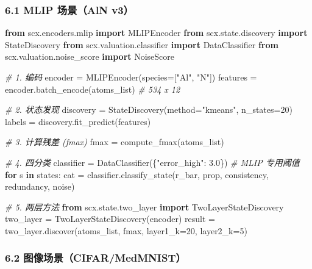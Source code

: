 \documentclass[
  12pt,
]{ctexart}
\newenvironment{Shaded}{}{}
\newcommand{\CommentTok}[1]{\textcolor[rgb]{0.38,0.63,0.69}{\textit{#1}}}
\newcommand{\ControlFlowTok}[1]{\textcolor[rgb]{0.00,0.44,0.13}{\textbf{#1}}}
\newcommand{\DecValTok}[1]{\textcolor[rgb]{0.25,0.63,0.44}{#1}}
\newcommand{\FloatTok}[1]{\textcolor[rgb]{0.25,0.63,0.44}{#1}}
\newcommand{\ImportTok}[1]{\textcolor[rgb]{0.00,0.50,0.00}{\textbf{#1}}}
\newcommand{\KeywordTok}[1]{\textcolor[rgb]{0.00,0.44,0.13}{\textbf{#1}}}
\newcommand{\NormalTok}[1]{#1}
\newcommand{\OperatorTok}[1]{\textcolor[rgb]{0.40,0.40,0.40}{#1}}
\newcommand{\StringTok}[1]{\textcolor[rgb]{0.25,0.44,0.63}{#1}}
\begin{document}
\subsubsection{6.1 MLIP 场景（AlN v3）}\label{mlip-ux573aux666faln-v3}

\begin{Shaded}
\begin{Highlighting}[]
\ImportTok{from}\NormalTok{ scx.encoders.mlip }\ImportTok{import}\NormalTok{ MLIPEncoder}
\ImportTok{from}\NormalTok{ scx.state.discovery }\ImportTok{import}\NormalTok{ StateDiscovery}
\ImportTok{from}\NormalTok{ scx.valuation.classifier }\ImportTok{import}\NormalTok{ DataClassifier}
\ImportTok{from}\NormalTok{ scx.valuation.noise\_score }\ImportTok{import}\NormalTok{ NoiseScore}

\CommentTok{\# 1. 编码}
\NormalTok{encoder }\OperatorTok{=}\NormalTok{ MLIPEncoder(species}\OperatorTok{=}\NormalTok{[}\StringTok{"Al"}\NormalTok{, }\StringTok{"N"}\NormalTok{])}
\NormalTok{features }\OperatorTok{=}\NormalTok{ encoder.batch\_encode(atoms\_list)  }\CommentTok{\# 534 x 12}

\CommentTok{\# 2. 状态发现}
\NormalTok{discovery }\OperatorTok{=}\NormalTok{ StateDiscovery(method}\OperatorTok{=}\StringTok{"kmeans"}\NormalTok{, n\_states}\OperatorTok{=}\DecValTok{20}\NormalTok{)}
\NormalTok{labels }\OperatorTok{=}\NormalTok{ discovery.fit\_predict(features)}

\CommentTok{\# 3. 计算残差 (fmax)}
\NormalTok{fmax }\OperatorTok{=}\NormalTok{ compute\_fmax(atoms\_list)}

\CommentTok{\# 4. 四分类}
\NormalTok{classifier }\OperatorTok{=}\NormalTok{ DataClassifier(\{}\StringTok{"error\_high"}\NormalTok{: }\FloatTok{3.0}\NormalTok{\})  }\CommentTok{\# MLIP 专用阈值}
\ControlFlowTok{for}\NormalTok{ s }\KeywordTok{in}\NormalTok{ states:}
\NormalTok{    cat }\OperatorTok{=}\NormalTok{ classifier.classify\_state(r\_bar, prop, consistency, redundancy, noise)}

\CommentTok{\# 5. 两层方法}
\ImportTok{from}\NormalTok{ scx.state.two\_layer }\ImportTok{import}\NormalTok{ TwoLayerStateDiscovery}
\NormalTok{two\_layer }\OperatorTok{=}\NormalTok{ TwoLayerStateDiscovery(encoder)}
\NormalTok{result }\OperatorTok{=}\NormalTok{ two\_layer.discover(atoms\_list, fmax, layer1\_k}\OperatorTok{=}\DecValTok{20}\NormalTok{, layer2\_k}\OperatorTok{=}\DecValTok{5}\NormalTok{)}
\end{Highlighting}
\end{Shaded}

\subsubsection{6.2
图像场景（CIFAR/MedMNIST）}\label{ux56feux50cfux573aux666fcifarmedmnist}
\end{document}
